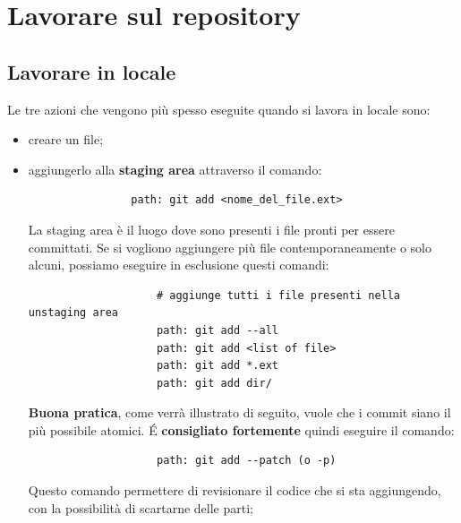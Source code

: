 

\newpage \clearpage
\section{Lavorare sul repository} %
\label{sec:lavorare_sul_repository}

	\subsection{Lavorare in locale} %
	\label{sub:lavorare_in_locale}
	Le tre azioni che vengono più spesso eseguite quando si lavora in locale sono:
		\begin{itemize}
			\item creare un file;
			\item aggiungerlo alla \textbf{staging area} attraverso il comando:
				\begin{verbatim}
				path: git add <nome_del_file.ext>
				\end{verbatim}
				\noindent
				La staging area è il luogo dove sono presenti i file pronti per essere committati.
				Se si vogliono aggiungere più file contemporaneamente o solo alcuni, possiamo eseguire in esclusione questi comandi:
					\begin{verbatim}
					# aggiunge tutti i file presenti nella unstaging area
					path: git add --all
					path: git add <list of file>
					path: git add *.ext
					path: git add dir/
					\end{verbatim}
				\noindent
				\textbf{Buona pratica}, come verrà illustrato di seguito, vuole che i commit siano il più possibile atomici. \'E \textbf{consigliato fortemente} quindi eseguire il comando:
					\begin{verbatim}
					path: git add --patch (o -p)
					\end{verbatim}
				\noindent
				Questo comando permettere di revisionare il codice che si sta aggiungendo, con la possibilità di scartarne delle parti;


\end{itemize}
